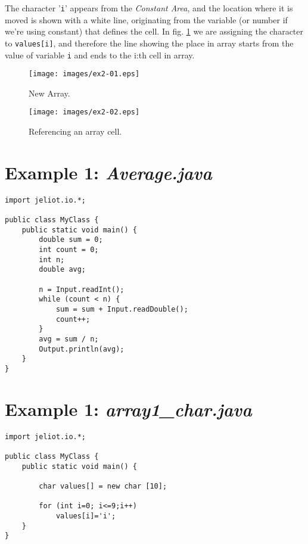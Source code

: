\documentclass[a4paper,12pt,english]{article}
\newcommand{\p}[1]{\texttt{#1}}
\begin{document}
The character '\p{i}' appears from the \emph{Constant Area}, and the location where it is moved is shown with a white line, originating from the variable (or number if we're using constant) that defines the cell. In fig. \ref{fig:ex2-02} we are assigning the character to \p{values[i]}, and therefore the line showing the place in array starts from the value of variable \p{i} and ends to the i:th cell in array.

\begin{figure}[ht]
  \begin{minipage}[t]{.49\textwidth}
    \begin{center}  
      \texttt{[image: images/ex2-01.eps]}
      \caption{\label{fig:ex2-01}New Array.}
    \end{center}
  \end{minipage}
  \hfill
  \begin{minipage}[t]{.49\textwidth}
    \begin{center}  
      \texttt{[image: images/ex2-02.eps]}
      \caption{\label{fig:ex2-02}Referencing an array cell.}
    \end{center}
  \end{minipage}
\end{figure}


\pagebreak
\appendix
\section{\label{app:ex1}Example 1: \textit{Average.java}}
\begin{verbatim}
import jeliot.io.*;

public class MyClass {
    public static void main() {
        double sum = 0;
        int count = 0;
        int n;
        double avg;

        n = Input.readInt();
        while (count < n) {
            sum = sum + Input.readDouble();
            count++;
        }
        avg = sum / n;
        Output.println(avg);
    }
}
\end{verbatim}

\section{\label{app:ex1}Example 1: \textit{array1\_char.java}}
\begin{verbatim}
import jeliot.io.*;

public class MyClass {
    public static void main() {

        char values[] = new char [10];

        for (int i=0; i<=9;i++)
            values[i]='i';
    }
}
\end{verbatim}
\end{document}
